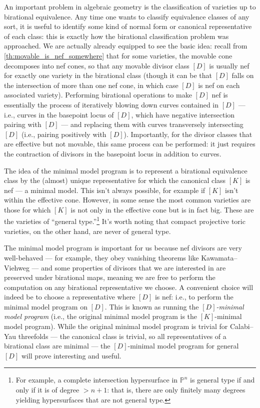 \documentclass[11pt,dvipsnames]{article}
\theoremstyle{definition}
\begin{document}
An important problem in algebraic geometry is the classification of varieties up to birational equivalence. Any time one wants to classify equivalence classes of any sort, it is useful to identify some kind of normal form or canonical representative of each class: this is exactly how the birational classification problem was approached. We are actually already equipped to see the basic idea: recall from \cref{th:movable_is_nef_somewhere} that for some varieties, the movable cone decomposes into nef cones, so that any movable divisor class $[D]$ is usually nef for exactly one variety in the birational class (though it can be that $[D]$ falls on the intersection of more than one nef cone, in which case $[D]$ is nef on each associated variety). Performing birational operations to make $[D]$ nef is essentially the process of iteratively blowing down curves contained in $[D]$ --- i.e., curves in the basepoint locus of $[D]$, which have negative intersection pairing with $[D]$ --- and replacing them with curves transversely intersecting $[D]$ (i.e., pairing positively with $[D]$). Importantly, for the divisor classes that are effective but not movable, this same process can be performed: it just requires the contraction of divisors in the basepoint locus in addition to curves.

The idea of the minimal model program is to represent a birational equivalence class by the (almost) unique representative for which the canonical class $[K]$ is nef --- a minimal model. This isn't always possible, for example if $[K]$ isn't within the effective cone. However, in some sense the most common varieties are those for which $[K]$ is not only in the effective cone but is in fact big. These are the varieties of ``general type.''\footnote{For example, a complete intersection hypersurface in $\mathbb{P}^n$ is general type if and only if it is of degree $> n+1$: that is, there are only finitely many degrees yielding hypersurfaces that are not general type.} It's worth noting that compact projective toric varieties, on the other hand, are never of general type.

The minimal model program is important for us because nef divisors are very well-behaved --- for example, they obey vanishing theorems like Kawamata--Viehweg --- and some properties of divisors that we are interested in are preserved under birational maps, meaning we are free to perform the computation on any birational representative we choose. A convenient choice will indeed be to choose a representative where $[D]$ is nef: i.e., to perform the minimal model program on $[D]$. This is known as running the \textit{$[D]$-minimal model program} (i.e., the original minimal model program is the $[K]$-minimal model program). While the original minimal model program is trivial for Calabi--Yau threefolds --- the canonical class is trivial, so all representatives of a birational class are minimal --- the $[D]$-minimal model program for general $[D]$ will prove interesting and useful.
\end{document}
